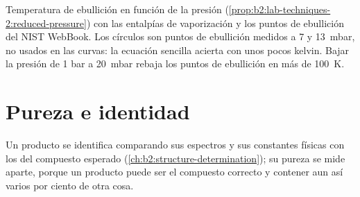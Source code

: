 \begin{omfigure}

{\small Temperatura de ebullición en función de la presión (\cref{prop:b2:lab-techniques-2:reduced-pressure}) con
las entalpías de vaporización y los puntos de ebullición del NIST WebBook. Los círculos son puntos de ebullición medidos
a 7 y \qty{13}{mbar}, no usados en las curvas: la ecuación sencilla acierta con unos pocos kelvin.
Bajar la presión de 1 bar a \qty{20}{mbar} rebaja los puntos de ebullición en más de
\qty{100}{K}.}
\end{omfigure}

\section{Pureza e identidad}

Un producto se identifica comparando sus espectros y sus constantes físicas con los del compuesto
esperado (\cref{ch:b2:structure-determination}); su pureza se mide aparte, porque un producto
puede ser el compuesto correcto y contener aun así varios por ciento de otra cosa.

